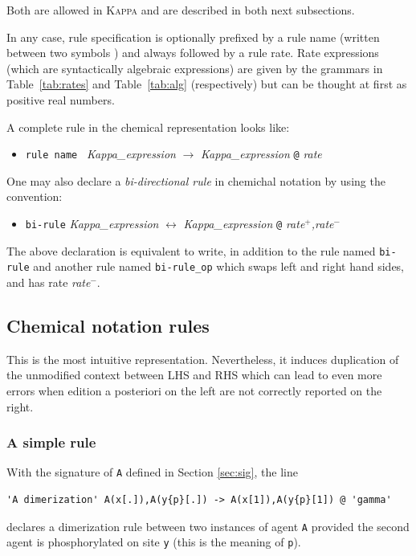 \documentclass[11pt]{book}
\def\Kappa{\textsc{Kappa}}
\def\ttt#1{\texttt{#1}}
\def\var#1{{\textquotesingle}#1{\textquotesingle}}
\def\rar{\rightarrow}
\def\lrar{\leftrightarrow}
\def\ITE#1{\begin{itemize}#1\end{itemize}}
\def\imp#1{\emph{#1}\index{#1}}
\begin{document}
Both are allowed in \Kappa{} and are described in both next subsections.

In any case, rule specification is optionally prefixed by a rule name
(written between two symbols \textquotesingle) and always followed by
a rule rate.  Rate expressions (which are syntactically algebraic
expressions) are given by the grammars in
Table~\ref{tab:rates} and Table~\ref{tab:alg} (respectively) but can
be thought at first as positive real numbers.

A complete rule in the chemical representation looks like:

\ITE{
\item[] \ttt{{\textquotesingle}rule name{\textquotesingle} } {\it
  Kappa\_expression} $\rar$ {\it Kappa\_expression} \ttt{@} {\it rate}
}

One may also declare a \imp{bi-directional rule} in chemichal notation by
using the convention:

\ITE{
\item[] \ttt{{\textquotesingle}bi-rule{\textquotesingle}} {\it Kappa\_expression} $\lrar$ {\it Kappa\_expression} \ttt{@} {\it rate$^+$,rate$^-$}
}

The above declaration is equivalent to write, in
addition to the rule named \ttt{\var{bi-rule}} and another rule named
\ttt{\var{bi-rule\_op}} which swaps left and right hand sides, and has
rate \textit{rate$^-$}.

\subsection{Chemical notation rules}

This is the most intuitive representation. Nevertheless, it induces
duplication of the unmodified context between LHS and RHS which can
lead to even more errors when edition a posteriori on the left are not
correctly reported on the right.

\subsubsection*{A simple rule}
With the signature of \ttt{A} defined in Section \ref{sec:sig}, the line
\begin{lstlisting}[language=kappa]
'A dimerization' A(x[.]),A(y{p}[.]) -> A(x[1]),A(y{p}[1]) @ 'gamma'
\end{lstlisting}
declares a dimerization rule between two instances of agent \ttt{A}
provided the second agent is phosphorylated on site \ttt{y} (this is the meaning of \ttt{p}).
\end{document}
